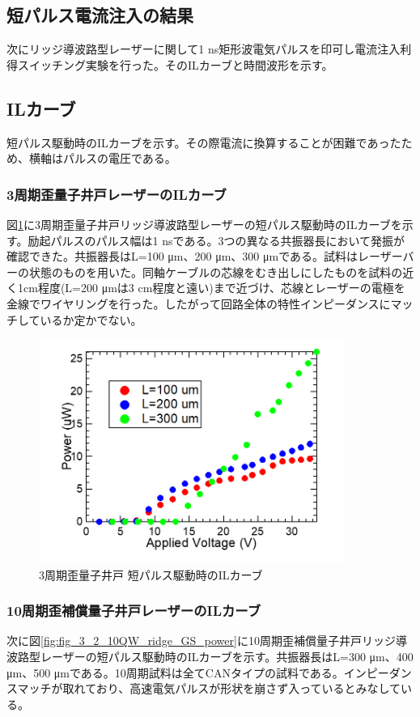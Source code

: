 {\clearpage
\subsection{短パルス電流注入の結果}

次にリッジ導波路型レーザーに関して1 ns矩形波電気パルスを印可し電流注入利得スイッチング実験を行った。そのILカーブと時間波形を示す。
\subsection{ILカーブ}
短パルス駆動時のILカーブを示す。その際電流に換算することが困難であったため、横軸はパルスの電圧である。
\subsubsection{3周期歪量子井戸レーザーのILカーブ}
図\ref{fig:fig_3_2_3QW_ridge_GS_power}に3周期歪量子井戸リッジ導波路型レーザーの短パルス駆動時のILカーブを示す。励起パルスのパルス幅は1 nsである。3つの異なる共振器長において発振が確認できた。共振器長はL=100 \si{\micro\metre}、200 \si{\micro\metre}、300 \si{\micro\metre}である。試料はレーザーバーの状態のものを用いた。同軸ケーブルの芯線をむき出しにしたものを試料の近く1cm程度(L=200 \si{\micro\metre}は3 cm程度と遠い)まで近づけ、芯線とレーザーの電極を金線でワイヤリングを行った。したがって回路全体の特性インピーダンスにマッチしているか定かでない。

\begin{figure}[h]
	\centering
	\includegraphics[width=10cm]{figure/fig_3_2_3QW_ridge_GS_power.png}
		\caption{3周期歪量子井戸 短パルス駆動時のILカーブ}
		\label{fig:fig_3_2_3QW_ridge_GS_power}
\end{figure}


\newpage
\subsubsection{10周期歪補償量子井戸レーザーのILカーブ}
次に図\ref{fig:fig_3_2_10QW_ridge_GS_power}に10周期歪補償量子井戸リッジ導波路型レーザーの短パルス駆動時のILカーブを示す。共振器長はL=300 \si{\micro\metre}、400 \si{\micro\metre}、500 \si{\micro\metre}である。10周期試料は全てCANタイプの試料である。インピーダンスマッチが取れており、高速電気パルスが形状を崩さず入っているとみなしている。

}
